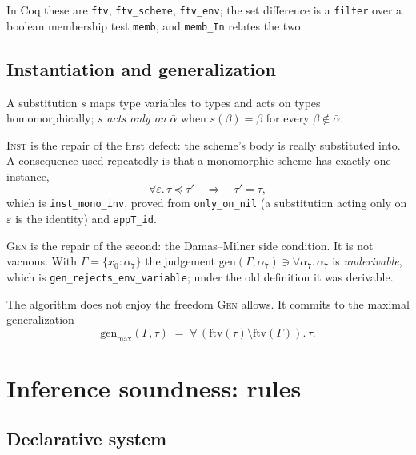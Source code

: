 \documentclass[11pt,a4paper]{article}
\newcommand{\ftv}{\mathrm{ftv}}
\newcommand{\gen}{\mathrm{gen}}
\newcommand{\genmax}{\mathrm{gen}_{\max}}
\newcommand{\inst}{\preceq}
\begin{document}
In Coq these are \texttt{ftv}, \texttt{ftv\_scheme}, \texttt{ftv\_env}; the
set difference is a \texttt{filter} over a boolean membership test
\texttt{memb}, and \texttt{memb\_In} relates the two.

\subsection{Instantiation and generalization}

A substitution $s$ maps type variables to types and acts on types
homomorphically; $s$ \emph{acts only on} $\bar\alpha$ when
$s(\beta) = \beta$ for every $\beta \notin \bar\alpha$.


\textsc{Inst} is the repair of the first defect: the scheme's body is really
substituted into.  A consequence used repeatedly is that a monomorphic scheme
has exactly one instance,
\[
  \forall\varepsilon.\,\tau \inst \tau'
  \quad\Longrightarrow\quad
  \tau' = \tau,
\]
which is \texttt{inst\_mono\_inv}, proved from \texttt{only\_on\_nil} (a
substitution acting only on $\varepsilon$ is the identity) and
\texttt{appT\_id}.

\textsc{Gen} is the repair of the second: the Damas--Milner side condition.
It is not vacuous.  With $\Gamma = \{x_0 : \alpha_7\}$ the judgement
$\gen(\Gamma, \alpha_7) \ni \forall\alpha_7.\,\alpha_7$ is \emph{underivable},
which is \texttt{gen\_rejects\_env\_variable}; under the old definition it was
derivable.

The algorithm does not enjoy the freedom \textsc{Gen} allows.  It commits to
the maximal generalization
\[
  \genmax(\Gamma,\tau) \;=\; \forall\,(\ftv(\tau) \setminus \ftv(\Gamma)).\,\tau .
\]

\section{Inference soundness: rules}

\subsection{Declarative system}
\end{document}
